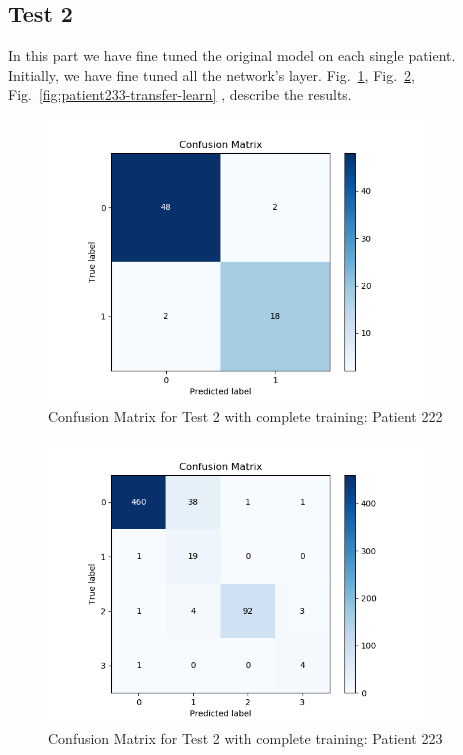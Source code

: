 \documentclass[LaM,binding=0.6cm]{sapthesis}
\begin{document}
\subsection{Test 2}
In this part we have fine tuned the original model on each single patient.\\Initially, we have fine tuned all the network's layer.
Fig.~\ref{fig:patient222-transfer-learn}, Fig.~\ref{fig:patient223-transfer-learn}, Fig.~\ref{fig:patient233-transfer-learn} , describe the results.
\begin{figure}[H]  \centering
    \includegraphics[width=100mm,scale=0.7]{patient222-transfer-learn}
    \caption{Confusion Matrix for Test 2 with complete training: Patient 222}
    \label{fig:patient222-transfer-learn}
\end{figure}
\begin{figure}[H]  \centering
    \includegraphics[width=100mm,scale=0.7]{patient223-transfer-learn}
    \caption{Confusion Matrix for Test 2 with complete training: Patient 223}
    \label{fig:patient223-transfer-learn}
\end{figure}
\end{document}
